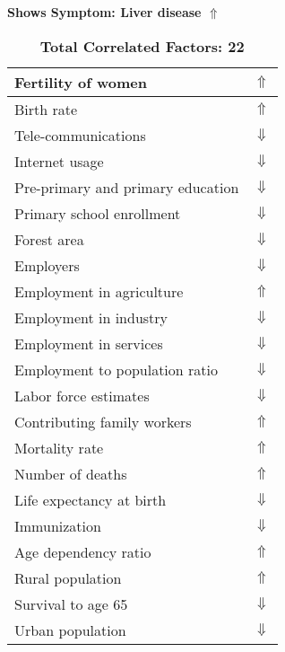\documentclass[12pt,notitlepage,oneside]{report}
\begin{document}
\clearpage
\begin{table}[!htb]
\caption{\textbf{Shows Symptom: Liver disease $\Uparrow$}}
\centering
\label{Correlated Socio-economic Factors0}
\begin{tabular}{|l|l|}
\hline
Fertility of women & $\Uparrow$\\ \hline
Birth rate & $\Uparrow$\\ \hline
Tele-communications & $\Downarrow$\\ \hline
Internet usage & $\Downarrow$\\ \hline
Pre-primary and primary education & $\Downarrow$\\ \hline
Primary school enrollment & $\Downarrow$\\ \hline
Forest area & $\Downarrow$\\ \hline
Employers & $\Downarrow$\\ \hline
Employment in agriculture & $\Uparrow$\\ \hline
Employment in industry & $\Downarrow$\\ \hline
Employment in services & $\Downarrow$\\ \hline
Employment to population ratio & $\Downarrow$\\ \hline
Labor force estimates & $\Downarrow$\\ \hline
Contributing family workers & $\Uparrow$\\ \hline
Mortality rate & $\Uparrow$\\ \hline
Number of deaths & $\Uparrow$\\ \hline
Life expectancy at birth & $\Downarrow$\\ \hline
Immunization & $\Downarrow$\\ \hline
Age dependency ratio & $\Uparrow$\\ \hline
Rural population & $\Uparrow$\\ \hline
Survival to age 65 & $\Downarrow$\\ \hline
Urban population & $\Downarrow$\\ \hline
\end{tabular}
\caption*{\textbf{Total Correlated Factors: 22}}
\end{table}
\end{document}
